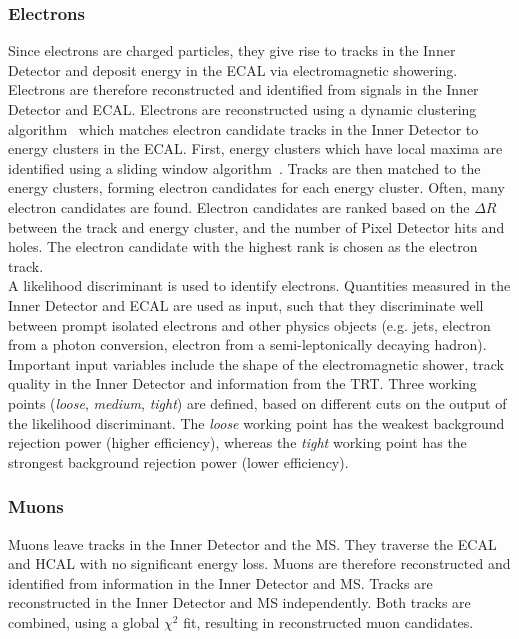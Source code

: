 \subsubsection{Electrons}
Since electrons are charged particles, they give rise to tracks in the Inner Detector and deposit energy in the ECAL via electromagnetic showering. Electrons are therefore reconstructed and identified from signals in the Inner Detector and ECAL. Electrons are reconstructed using a dynamic clustering algorithm~\cite{electronRecoAndID:paper} which matches electron candidate tracks in the Inner Detector to energy clusters in the ECAL. First, energy clusters which have local maxima are identified using a sliding window algorithm~\cite{Aad:2138166}. Tracks are then matched to the energy clusters, forming electron candidates for each energy cluster. Often, many electron candidates are found. Electron candidates are ranked based on the $\Delta R$ between the track and energy cluster, and the number of Pixel Detector hits and holes. The electron candidate with the highest rank is chosen as the electron track.\\

A likelihood discriminant is used to identify electrons. Quantities measured in the Inner Detector and ECAL are used as input, such that they discriminate well between prompt isolated electrons and other physics objects (e.g. jets, electron from a photon conversion, electron from a semi-leptonically decaying hadron). Important input variables include the shape of the electromagnetic shower, track quality in the Inner Detector and information from the TRT. Three working points (\textit{loose}, \textit{medium}, \textit{tight}) are defined, based on different cuts on the output of the likelihood discriminant. The \textit{loose} working point has the weakest background rejection power (higher efficiency), whereas the \textit{tight} working point has the strongest background rejection power (lower efficiency). 

\subsubsection{Muons}
Muons leave tracks in the Inner Detector and the MS. They traverse the ECAL and HCAL with no significant energy loss. Muons are therefore reconstructed and identified from information in the Inner Detector and MS. Tracks are reconstructed in the Inner Detector and MS independently. Both tracks are combined, using a global $\chi^{2}$ fit, resulting in reconstructed muon candidates.\\

